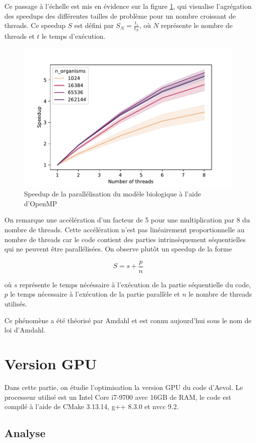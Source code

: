 \documentclass[a4paper, 10pt, twoside]{article}
\begin{document}
Ce passage à l'échelle est mis en évidence sur la figure \ref{fig:speedup/omp}, qui visualise l'agrégation des speedups des différentes tailles de problème pour un nombre croissant de threads.
Ce speedup $S$ est défini par $ S_N = \frac{t_1}{t_N} $, où $N$ représente le nombre de threads et $t$ le temps d'exécution.

\begin{figure}[htbp]
	\centering
	\includegraphics[width=0.5\linewidth]{img/speedup.pdf}
	\caption{Speedup de la parallélisation du modèle biologique à l'aide d'OpenMP}
	\label{fig:speedup/omp}
\end{figure}

On remarque une accélération d'un facteur de 5 pour une multiplication par 8 du nombre de threads. Cette accélération n'est pas linéairement proportionnelle au nombre de threads car le code contient des parties intrinsèquement séquentielles qui ne peuvent être parallélisées. On observe plutôt un speedup de la forme

$$ S = s + \frac{p}{n} $$

où $s$ représente le temps nécéssaire à l'exécution de la partie séquentielle du code, $p$ le temps nécessaire à l'exécution de la partie parallèle et $n$ le nombre de threads utilisés.

Ce phénomène a été théorisé par Amdahl \cite{amdahl2007validity} et est connu aujourd'hui sous le nom de loi d'Amdahl.

\section{Version GPU}

Dans cette partie, on étudie l'optimisation la version GPU du code d'Aevol. Le processeur utilisé est un Intel Core i7-9700 avec 16GB de RAM, le code est compilé à l'aide de CMake 3.13.14, g++ 8.3.0 et nvcc 9.2.

\subsection{Analyse}
\end{document}
